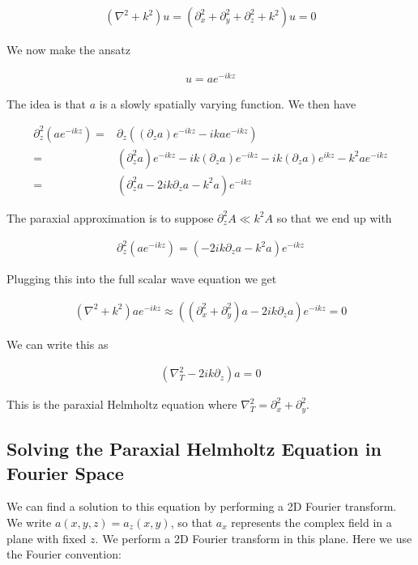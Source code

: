 \documentclass[12pt]{article}
\begin{document}
\begin{align}
\left(\nabla^2 + k^2\right)u = \left(\partial_x^2 +  \partial_y^2 + \partial_z^2 + k^2\right)u = 0
\end{align}

We now make the ansatz

\begin{align}
u = a e^{-ikz}
\end{align}

The idea is that $a$ is a slowly spatially varying function. 
We then have

\begin{align}
\partial_z^2 \left(a e^{-ikz}\right) =& \partial_z\left((\partial_z a) e^{-ikz} - ik a e^{-ikz}\right)\\
=& (\partial_z^2 a) e^{-ikz} - ik (\partial_z a) e^{-ikz} - ik(\partial_z a)e^{ikz} - k^2 a e^{-ikz}\\
=& \left(\partial_z^2 a - 2ik \partial_z a - k^2 a\right)e^{-ikz}
\end{align}

The paraxial approximation is to suppose $\partial_z^2 A \ll k^2 A$ so that we end up with

\begin{align}
\partial_z^2\left(ae^{-ikz}\right) = \left(-2ik\partial_z a - k^2 a\right)e^{-ikz}
\end{align}

Plugging this into the full scalar wave equation we get

\begin{align}
\left(\nabla^2 + k^2\right)a e^{-ikz} \approx \left((\partial_x^2 + \partial_y^2)a - 2ik \partial_z a\right)e^{-ikz} = 0
\end{align}

We can write this as

\begin{align}
\label{eq:Parax}
\left(\nabla_T^2 - 2ik \partial_z\right)a = 0
\end{align}

This is the paraxial Helmholtz equation where $\nabla^2_T = \partial_x^2 + \partial_y^2$.

\subsection{Solving the Paraxial Helmholtz Equation in Fourier Space}

We can find a solution to this equation by performing a 2D Fourier transform.
We write $a(x,y,z) = a_z(x,y)$, so that $a_x$ represents the complex field in a plane with fixed $z$.
We perform a 2D Fourier transform in this plane.
Here we use the Fourier convention:
\end{document}
